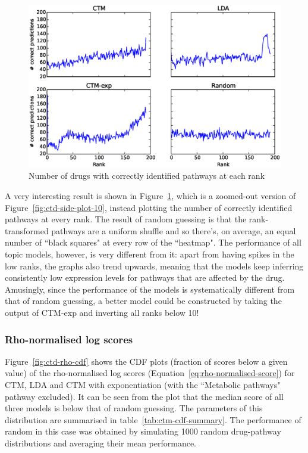 \documentclass[12pt,a4paper,twoside,openright]{report}
\begin{document}
\begin{figure}[!htb]
\includegraphics[width=\textwidth]{ctd-side-plots.eps}
\caption{Number of drugs with correctly identified pathways at each rank}
\label{fig:ctd-side-plots}
\end{figure}

A very interesting result is shown in Figure~\ref{fig:ctd-side-plots}, which is a zoomed-out version of Figure~\ref{fig:ctd-side-plot-10}, instead plotting the number of correctly identified pathways at every rank. The result of random guessing is that the rank-transformed pathways are a uniform shuffle and so there's, on average, an equal number of ``black squares" at every row of the ``heatmap". The performance of all topic models, however, is very different from it: apart from having spikes in the low ranks, the graphs also trend upwards, meaning that the models keep inferring consistently low expression levels for pathways that are affected by the drug. Amusingly, since the performance of the models is systematically different from that of random guessing, a better model could be constructed by taking the output of CTM-exp and inverting all ranks below 10!

\subsubsection{Rho-normalised log scores}
Figure~\ref{fig:ctd-rho-cdf} shows the CDF plots (fraction of scores below a given value) of the rho-normalised log scores (Equation~\ref{eq:rho-normalised-score}) for CTM, LDA and CTM with exponentiation (with the ``Metabolic pathways" pathway excluded). It can be seen from the plot that the median score of all three models is below that of random guessing. The parameters of this distribution are summarised in table~\ref{tab:ctm-cdf-summary}. The performance of random in this case was obtained by simulating 1000 random drug-pathway distributions and averaging their mean performance.
\end{document}
